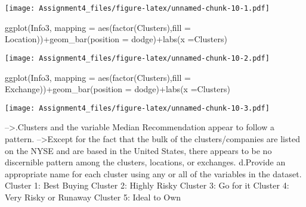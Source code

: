 \documentclass[
]{article}
\newenvironment{Shaded}{\begin{snugshade}}{\end{snugshade}}
\newcommand{\AttributeTok}[1]{\textcolor[rgb]{0.77,0.63,0.00}{#1}}
\newcommand{\DecValTok}[1]{\textcolor[rgb]{0.00,0.00,0.81}{#1}}
\newcommand{\FunctionTok}[1]{\textcolor[rgb]{0.00,0.00,0.00}{#1}}
\newcommand{\NormalTok}[1]{#1}
\newcommand{\OtherTok}[1]{\textcolor[rgb]{0.56,0.35,0.01}{#1}}
\newcommand{\SpecialCharTok}[1]{\textcolor[rgb]{0.00,0.00,0.00}{#1}}
\newcommand{\StringTok}[1]{\textcolor[rgb]{0.31,0.60,0.02}{#1}}
\begin{document}
\begin{Shaded}
\end{Shaded}

\texttt{[image: Assignment4\_files/figure-latex/unnamed-chunk-10-1.pdf]}

\begin{Shaded}
\begin{Highlighting}[]
\FunctionTok{ggplot}\NormalTok{(Info3, }\AttributeTok{mapping =} \FunctionTok{aes}\NormalTok{(}\FunctionTok{factor}\NormalTok{(Clusters),}\AttributeTok{fill =}\NormalTok{ Location))}\SpecialCharTok{+}\FunctionTok{geom\_bar}\NormalTok{(}\AttributeTok{position =} \StringTok{\textquotesingle{}dodge\textquotesingle{}}\NormalTok{)}\SpecialCharTok{+}\FunctionTok{labs}\NormalTok{(}\AttributeTok{x =}\StringTok{\textquotesingle{}Clusters\textquotesingle{}}\NormalTok{)}
\end{Highlighting}
\end{Shaded}

\texttt{[image: Assignment4\_files/figure-latex/unnamed-chunk-10-2.pdf]}

\begin{Shaded}
\begin{Highlighting}[]
\FunctionTok{ggplot}\NormalTok{(Info3, }\AttributeTok{mapping =} \FunctionTok{aes}\NormalTok{(}\FunctionTok{factor}\NormalTok{(Clusters),}\AttributeTok{fill =}\NormalTok{ Exchange))}\SpecialCharTok{+}\FunctionTok{geom\_bar}\NormalTok{(}\AttributeTok{position =} \StringTok{\textquotesingle{}dodge\textquotesingle{}}\NormalTok{)}\SpecialCharTok{+}\FunctionTok{labs}\NormalTok{(}\AttributeTok{x =}\StringTok{\textquotesingle{}Clusters\textquotesingle{}}\NormalTok{)}
\end{Highlighting}
\end{Shaded}

\texttt{[image: Assignment4\_files/figure-latex/unnamed-chunk-10-3.pdf]}

--\textgreater.Clusters and the variable Median Recommendation appear to
follow a pattern. --\textgreater Except for the fact that the bulk of
the clusters/companies are listed on the NYSE and are based in the
United States, there appears to be no discernible pattern among the
clusters, locations, or exchanges. d.Provide an appropriate name for
each cluster using any or all of the variables in the dataset. Cluster
1: Best Buying Cluster 2: Highly Risky Cluster 3: Go for it Cluster 4:
Very Risky or Runaway Cluster 5: Ideal to Own
\end{document}

